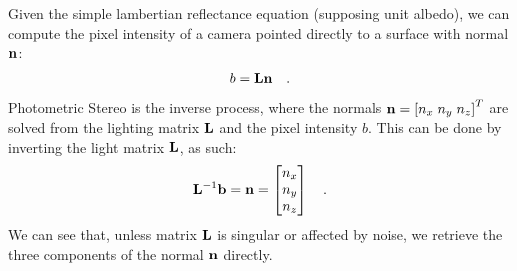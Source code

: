 \documentclass{report}
\begin{document}
Given the simple lambertian reflectance equation (supposing unit albedo), we can compute the pixel intensity of a camera pointed directly to a surface with normal $\mathbf{n}$:
\begin{equation}
b = \mathbf{L}\mathbf{n}
\quad.
\end{equation}
Photometric Stereo is the inverse process, where the normals $\mathbf{n} = \left[ n_x \; n_y \; n_z\right]^T$ are solved from the lighting matrix $\mathbf{L}$ and the pixel intensity $b$. This can be done by inverting the light matrix $\mathbf{L}$, as such:
\begin{equation}
\mathbf{L}^{-1}\mathbf{b} = \mathbf{n} = 
\begin{bmatrix}
n_x \\
n_y \\
n_z 
\end{bmatrix}
\quad.
\end{equation}
We can see that, unless matrix $\mathbf{L}$ is singular or affected by noise, we retrieve the three components of the normal $\mathbf{n}$ directly.
\end{document}
